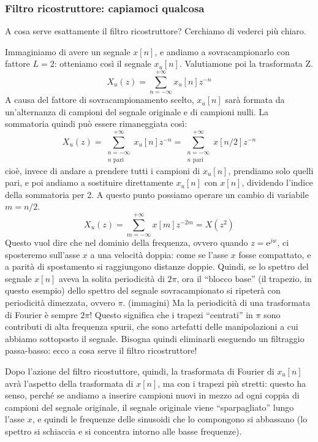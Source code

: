 \documentclass[a4paper,11pt]{article}
\begin{document}
\subsubsection{Filtro ricostruttore: capiamoci qualcosa}
A cosa serve esattamente il filtro ricostruttore? Cerchiamo di vederci più chiaro.
\par
Immaginiamo di avere un segnale $x[n]$, e andiamo a sovracampionarlo con fattore $L=2$: otteniamo così il segnale $x_u[n]$. Valutiamone poi la trasformata Z.
\[
X_u(z) = \sum_{n=-\infty}^{+\infty} x_u[n] z^{-n}
\]
A causa del fattore di sovracampionamento scelto, $x_u[n]$ sarà formata da un'alternanza di campioni del segnale originale e di campioni nulli. La sommatoria quindi può essere
rimaneggiata così:
\[
X_u(z) = \sum_{\substack{n=-\infty \\ n \text{ pari}}}^{+\infty} x_u[n] z^{-n}
 = \sum_{\substack{n=-\infty \\ n \text{ pari}}}^{+\infty} x[n/2] z^{-n}
\]
cioè, invece di andare a prendere tutti i campioni di $x_u[n]$, prendiamo solo quelli pari, e poi andiamo a sostituire direttamente $x_u[n]$ con $x[n]$,
dividendo l'indice della sommatoria per 2. A questo punto possiamo operare un cambio di variabile $m = n/2$.
\[
X_u(z) = \sum_{m=-\infty}^{+\infty} x[m] z^{-2m} = X(z^2)
\]
Questo vuol dire che nel dominio della frequenza, ovvero quando $z = \mathrm{e}^{jw}$, ci sposteremo sull'asse $x$ a una velocità doppia: come se l'asse $x$ fosse
compattato, e a parità di spostamento si raggiungono distanze doppie. Quindi, se lo spettro del segnale $x[n]$ aveva la solita periodicità di $2\pi$, ora il ``blocco base''
(il trapezio, in questo esempio) dello spettro del segnale sovracampionato si ripeterà con periodicità dimezzata, ovvero $\pi$. (immagini)
Ma la periodicità di una trasformata di Fourier è sempre $2\pi$! Questo significa che i trapezi ``centrati'' in $\pi$ sono contributi di alta frequenza spurii, che sono
artefatti delle manipolazioni a cui abbiamo sottoposto il segnale. Bisogna quindi eliminarli eseguendo un filtraggio passa-basso: ecco a cosa serve il filtro ricostruttore!
\par
Dopo l'azione del filtro ricostuttore, quindi, la trasformata di Fourier di $x_u[n]$ avrà l'aspetto della trasformata di $x[n]$, ma con i trapezi più stretti:
questo ha senso, perché se andiamo a inserire campioni nuovi in mezzo ad ogni coppia di campioni del segnale originale, il segnale originale viene ``sparpagliato'' lungo l'asse $x$,
e quindi le frequenze delle sinusoidi che lo compongono si abbassano (lo spettro si schiaccia e si concentra intorno alle basse frequenze).
\end{document}
